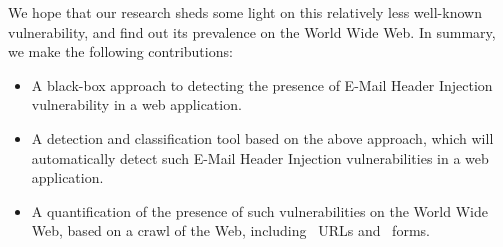 We hope that our research sheds some light on this relatively less well-known vulnerability, and find out its prevalence on the World Wide Web. In summary, we make the following contributions:
\begin{itemize}
	
	\item{A black-box approach to detecting the presence of E-Mail Header Injection vulnerability in a web application.}
	
	\item{A detection and classification tool based on the above approach, which will automatically detect such E-Mail Header Injection vulnerabilities in a web application.}
	
	\item{A quantification of the presence of such vulnerabilities on the World Wide Web, based on a crawl of the Web, including \urls\ URLs and \forms\ forms.}
	
\end{itemize}